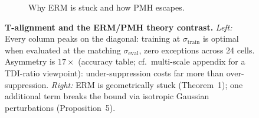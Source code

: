 \begin{figure}[t]
\begin{subfigure}[b]{0.46\textwidth}
\caption{Why ERM is stuck and how PMH escapes.}
\end{subfigure}
\caption{\textbf{T-alignment and the ERM/PMH theory contrast.}
\emph{Left:} Every column peaks on the diagonal: training at $\sigma_\mathrm{train}$ is
optimal when evaluated at the matching $\sigma_\mathrm{eval}$, zero exceptions across 24 cells.
Asymmetry is $17\times$ (accuracy table; cf.\ multi-scale appendix for a TDI-ratio viewpoint):
under-suppression costs far more than over-suppression.
\emph{Right:} ERM is geometrically stuck (Theorem~1); one additional term breaks the bound
via isotropic Gaussian perturbations (Proposition~5).}
\label{fig:a7}
\end{figure}
